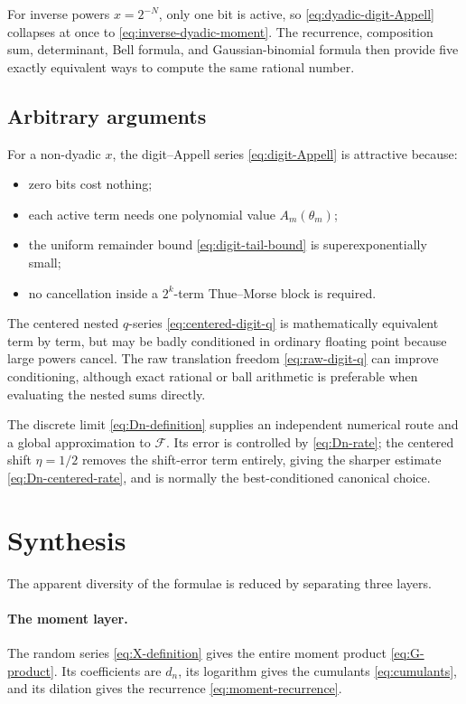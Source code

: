 \documentclass[11pt,oneside]{article}
\theoremstyle{definition}
\theoremstyle{remark}
\newcommand{\Fglobal}{\mathcal F}
\begin{document}
For inverse powers $x=2^{-N}$, only one bit is active, so
\eqref{eq:dyadic-digit-Appell} collapses at once to
\eqref{eq:inverse-dyadic-moment}.  The recurrence, composition sum,
determinant, Bell formula, and Gaussian-binomial formula then provide five
exactly equivalent ways to compute the same rational number.

\subsection{Arbitrary arguments}

For a non-dyadic $x$, the digit--Appell series
\eqref{eq:digit-Appell} is attractive because:
\begin{itemize}
\item zero bits cost nothing;
\item each active term needs one polynomial value $A_m(\theta_m)$;
\item the uniform remainder bound \eqref{eq:digit-tail-bound} is
  superexponentially small;
\item no cancellation inside a $2^k$-term Thue--Morse block is required.
\end{itemize}

The centered nested $q$-series \eqref{eq:centered-digit-q} is mathematically
equivalent term by term, but may be badly conditioned in ordinary floating
point because large powers cancel.  The raw translation freedom
\eqref{eq:raw-digit-q} can improve conditioning, although exact rational or
ball arithmetic is preferable when evaluating the nested sums directly.

The discrete limit \eqref{eq:Dn-definition} supplies an independent numerical
route and a global approximation to $\Fglobal$.  Its error is controlled by
\eqref{eq:Dn-rate}; the centered shift $\eta=1/2$ removes the shift-error term
entirely, giving the sharper estimate \eqref{eq:Dn-centered-rate}, and is
normally the best-conditioned canonical choice.

\section{Synthesis}

The apparent diversity of the formulae is reduced by separating three layers.

\paragraph{The moment layer.}
The random series \eqref{eq:X-definition} gives the entire moment product
\eqref{eq:G-product}.  Its coefficients are $d_n$, its logarithm gives the
cumulants \eqref{eq:cumulants}, and its dilation gives the recurrence
\eqref{eq:moment-recurrence}.
\end{document}
